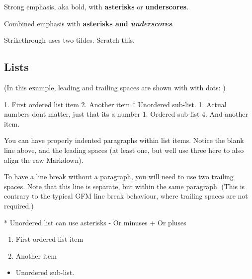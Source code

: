 \documentclass[
]{tufte-pandoc}
\newenvironment{Shaded}{}{}
\newcommand{\NormalTok}[1]{#1}
\providecommand{\tightlist}{%
  \setlength{\itemsep}{0pt}\setlength{\parskip}{0pt}}
\begin{document}
Strong emphasis, aka bold, with \textbf{asterisks} or
\textbf{underscores}.

Combined emphasis with \textbf{asterisks and \emph{underscores}}.

Strikethrough uses two tildes. \sout{Scratch this.}

\hypertarget{lists}{%
\subsection{Lists}\label{lists}}

(In this example, leading and trailing spaces are shown with with dots:
)

\begin{Shaded}
\begin{Highlighting}[]
\NormalTok{1. First ordered list item}
\NormalTok{2. Another item}
\NormalTok{  * Unordered sub{-}list.}
\NormalTok{1. Actual numbers don\textquotesingle{}t matter, just that it\textquotesingle{}s a number}
\NormalTok{  1. Ordered sub{-}list}
\NormalTok{4. And another item.}

\NormalTok{   You can have properly indented paragraphs within list items. Notice the blank line above, and the leading spaces (at least one, but we\textquotesingle{}ll use three here to also align the raw Markdown).}

\NormalTok{   To have a line break without a paragraph, you will need to use two trailing spaces.}
\NormalTok{   Note that this line is separate, but within the same paragraph.}
\NormalTok{   (This is contrary to the typical GFM line break behaviour, where trailing spaces are not required.)}

\NormalTok{* Unordered list can use asterisks}
\NormalTok{{-} Or minuses}
\NormalTok{+ Or pluses}
\end{Highlighting}
\end{Shaded}

\begin{enumerate}
\def\labelenumi{\arabic{enumi}.}
\tightlist
\item
  First ordered list item
\item
  Another item
\end{enumerate}

\begin{itemize}
\tightlist
\item
  Unordered sub-list.
\end{itemize}
\end{document}
